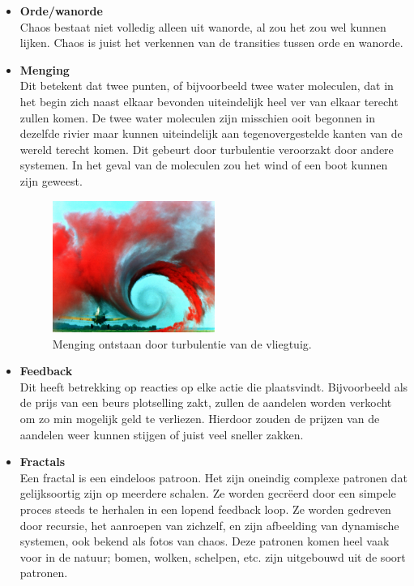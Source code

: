 \documentclass{article}
\begin{document}
\begin{itemize}
\item{\textbf{Orde/wanorde} \\
Chaos bestaat niet volledig alleen uit wanorde, al zou het zou wel kunnen lijken. Chaos is juist het verkennen van de transities tussen orde en wanorde.}

\item{\textbf{Menging} \\
Dit betekent dat twee punten, of bijvoorbeeld twee water moleculen, dat in het begin zich naast elkaar bevonden uiteindelijk heel ver van elkaar terecht zullen komen. De twee water moleculen zijn misschien ooit begonnen in dezelfde rivier maar kunnen uiteindelijk aan tegenovergestelde kanten van de wereld terecht komen. Dit gebeurt door turbulentie veroorzakt door andere systemen. In het geval van de moleculen zou het wind of een boot kunnen zijn geweest.

\begin{figure}[Hh]
	\centering
	\includegraphics[width=0.5\textwidth]{Airplane_vortex}
	\caption{Menging ontstaan door turbulentie van de vliegtuig.}
\end{figure}
}

\item{\textbf{Feedback} \\
Dit heeft betrekking op reacties op elke actie die plaatsvindt. Bijvoorbeeld als de prijs van een beurs plotselling zakt, zullen de aandelen worden verkocht om zo min mogelijk geld te verliezen. Hierdoor zouden de prijzen van de aandelen weer kunnen stijgen of juist veel sneller zakken.}

\item{\textbf{Fractals} \\
Een fractal is een eindeloos patroon. Het zijn oneindig complexe patronen dat gelijksoortig zijn op meerdere schalen. Ze worden gecr\"eerd door een simpele proces steeds te herhalen in een lopend feedback loop. Ze worden gedreven door recursie, het aanroepen van zichzelf, en zijn afbeelding van dynamische systemen, ook bekend als fotos van chaos. Deze patronen komen heel vaak voor in de natuur; bomen, wolken, schelpen, etc. zijn uitgebouwd uit de soort patronen.

}
\end{itemize}
\end{document}

